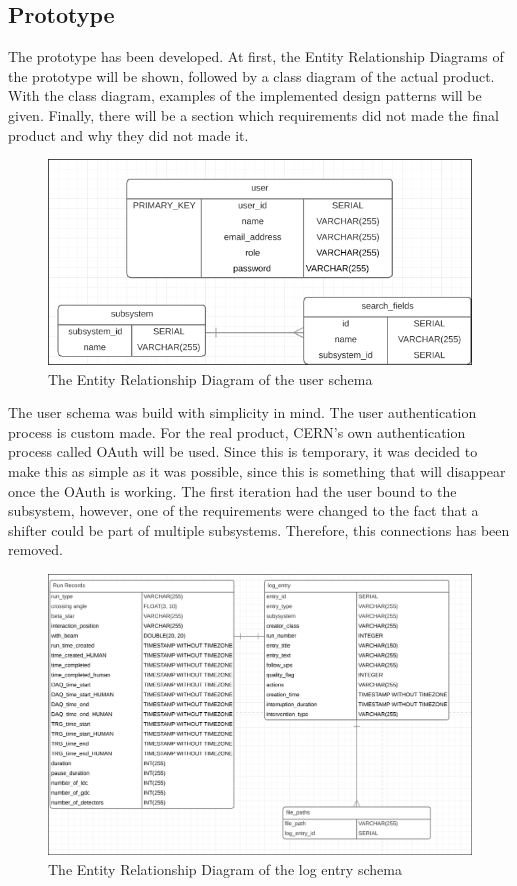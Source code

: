 \documentclass[paper=a4, fontsize=11pt,twoside]{scrartcl}	%
\begin{document}
\subsection{Prototype}
The prototype has been developed. At first, the Entity Relationship Diagrams of the prototype will be shown, followed by a class diagram of the actual product. With the class diagram, examples of the implemented design patterns will be given. Finally, there will be a section which requirements did not made the final product and why they did not made it.
\begin{figure}[H]
\centering
\includegraphics[scale=0.5]{erd_user}
\caption{The Entity Relationship Diagram of the user schema}
\end{figure}
\noindent
The user schema was build with simplicity in mind. The user authentication process is custom made. For the real product, CERN's own authentication process called OAuth will be used. Since this is temporary, it was decided to make this as simple as it was possible, since this is something that will disappear once the OAuth is working. The first iteration had the user bound to the subsystem, however, one of the requirements were changed to the fact that a shifter could be part of multiple subsystems. Therefore, this connections has been removed.
\begin{figure}[H]
\includegraphics[scale=0.4]{erd_log_entry}
\caption{The Entity Relationship Diagram of the log entry schema}
\end{figure}
\end{document}
